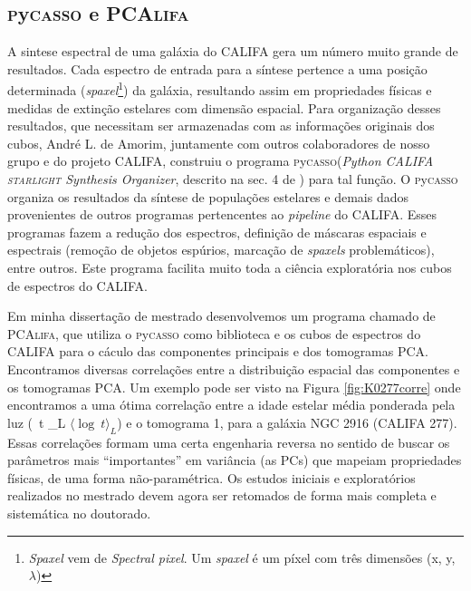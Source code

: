 \documentclass[a4paper,12pt]{article}
\newcommand\pycasso{\textsc{p}y\textsc{casso}\xspace}
\newcommand\pcalifa{PCA\textsc{lifa}\xspace}
\newcommand{\meanL}[1]{\relax\ifmmode \langle #1 \rangle_L \else $\langle #1 \rangle_L$\xspace \fi}
\def\starlight{\textsc{starlight}\xspace}      %
\begin{document}
\subsection{\pycasso e \pcalifa}
\vspace{0.3cm}
A sintese espectral de uma galáxia do CALIFA gera um número muito grande de resultados. Cada espectro de entrada para a síntese pertence a uma posição
determinada ({\em spaxel}\footnote{{\em Spaxel} vem de {\em Spectral pixel}. Um {\em spaxel} é um píxel com três dimensões (x, y, $\lambda$)}) da
galáxia, resultando assim em propriedades físicas e medidas de extinção estelares com dimensão espacial. Para organização desses resultados, que
necessitam ser armazenadas com as informações originais dos cubos, André L. de Amorim, juntamente com outros colaboradores de nosso grupo e do projeto
CALIFA, construiu o programa \pycasso ({\em Python CALIFA \starlight Synthesis Organizer}, descrito na sec. 4 de \citet{CidFernandes2013}) para tal
função. O \pycasso organiza os resultados da síntese de populações estelares e demais dados provenientes de outros programas pertencentes ao {\em
pipeline} do CALIFA. Esses programas fazem a redução dos espectros, definição de máscaras espaciais e espectrais (remoção de objetos espúrios,
marcação de {\em spaxels} problemáticos), entre outros. Este programa facilita muito toda a ciência exploratória nos cubos de espectros do CALIFA.

Em minha dissertação de mestrado desenvolvemos um programa chamado de \pcalifa, que utiliza o \pycasso como biblioteca e os cubos de espectros do
CALIFA para o cáculo das componentes principais e dos tomogramas PCA. Encontramos diversas correlações entre a distribuição espacial das componentes e
os tomogramas PCA. Um exemplo pode ser visto na Figura \ref{fig:K0277corre} onde encontramos a uma ótima correlação entre a idade estelar média
ponderada pela luz (\meanL{\log\ t}) e o tomograma 1, para a galáxia NGC 2916 (CALIFA 277). Essas correlações formam uma certa engenharia reversa no
sentido de buscar os parâmetros mais ``importantes'' em variância (as PCs) que mapeiam propriedades físicas, de uma forma não-paramétrica. Os estudos
iniciais e exploratórios realizados no mestrado devem agora ser retomados de forma mais completa e sistemática no doutorado.
\end{document}
